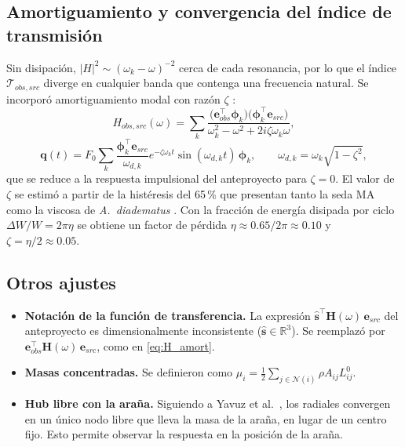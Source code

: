 \documentclass[11pt,letterpaper]{article}
\begin{document}
\subsection{Amortiguamiento y convergencia del índice de transmisión}

Sin disipación, $|H|^2\sim(\omega_k-\omega)^{-2}$ cerca de cada resonancia,
por lo que el índice $\mathcal{T}_{obs,src}$ diverge en cualquier banda que
contenga una frecuencia natural. Se incorporó amortiguamiento modal con
razón $\zeta$ \cite{ewins2000,inman2014}:
\begin{equation}\label{eq:H_amort}
    H_{obs,src}(\omega)=\sum_{k}
    \frac{\bigl(\mathbf{e}_{obs}^\top\boldsymbol{\phi}_k\bigr)
          \bigl(\boldsymbol{\phi}_k^\top\mathbf{e}_{src}\bigr)}
         {\omega_k^2-\omega^2+2i\zeta\omega_k\omega},
\end{equation}
\begin{equation}\label{eq:imp_amort}
    \mathbf{q}(t)=F_0\sum_k
    \frac{\boldsymbol{\phi}_k^\top\mathbf{e}_{src}}{\omega_{d,k}}
    e^{-\zeta\omega_k t}\sin(\omega_{d,k}t)\,\boldsymbol{\phi}_k,
    \qquad \omega_{d,k}=\omega_k\sqrt{1-\zeta^2},
\end{equation}
que se reduce a la respuesta impulsional del anteproyecto para $\zeta=0$.
El valor de $\zeta$ se estimó a partir de la histéresis del 65\,\% que
presentan tanto la seda MA como la viscosa de \textit{A.~diadematus}
\cite{gosline1999}. Con la fracción de energía disipada por ciclo
$\Delta W/W = 2\pi\eta$ se obtiene un factor de pérdida
$\eta\approx0.65/2\pi\approx0.10$ y $\zeta=\eta/2\approx0.05$.

\subsection{Otros ajustes}

\begin{itemize}
    \item \textbf{Notación de la función de transferencia.} La expresión
    $\hat{\mathbf{s}}^\top\mathbf{H}(\omega)\,\mathbf{e}_{src}$ del
    anteproyecto es dimensionalmente inconsistente
    ($\hat{\mathbf{s}}\in\mathbb{R}^3$). Se reemplazó por
    $\mathbf{e}_{obs}^\top\mathbf{H}(\omega)\,\mathbf{e}_{src}$, como en
    \eqref{eq:H_amort}.
    \item \textbf{Masas concentradas.} Se definieron como
    $\mu_i=\tfrac12\sum_{j\in\mathcal{N}(i)}\rho A_{ij}L^0_{ij}$.
    \item \textbf{Hub libre con la araña.} Siguiendo a
    Yavuz et al.\ \cite{yavuz2024}, los radiales convergen en un
    único nodo libre que lleva la masa de la araña, en lugar de un centro
    fijo. Esto permite observar la respuesta en la posición de la araña.
\end{itemize}
\end{document}
